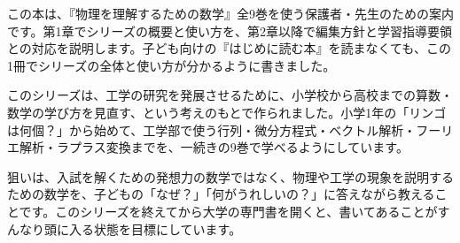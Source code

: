 \makeatletter
\newcommand\kgdspine[5]{%
  \fill[bkVol#2, draw=bkInk!60, line width=0.5pt, rounded corners=0.6mm] (#1,0) rectangle ++(#3,64);
  \node[text=bkOn#2, font=\sffamily\bfseries\footnotesize, inner sep=0pt] at ({#1+#3/2},58.5) {#2};
  \node[text=bkOn#2, font=\sffamily\bfseries\footnotesize, inner sep=0pt, anchor=north, align=center, text width=#3 mm, execute at begin node={\baselineskip=10.6pt}] at ({#1+#3/2},53.5) {#4};%
  \node[font=\sffamily\footnotesize, text=bkInk, inner sep=0pt, anchor=north] at ({#1+#3/2},-1.6) {#5};}
\newcommand\kgdpart[5]{\node[kgb box, anchor=west, minimum width=43.5mm, text width=39.5mm, minimum height=8.6mm, align=left, inner xsep=1.5mm, inner ysep=1mm] (#5) at (#3,#4)
  {\makebox[5mm][l]{\if\relax\detokenize{#2}\relax\else\ifcsname kgd@ibox@#2\endcsname\usebox{\csname kgd@ibox@#2\endcsname}\else\bkicon[1.1em]{#2}{bkVol0}\fi\fi}\hspace{0.5mm}#1};}
\newsavebox\kgd@ibox@hatena
\sbox{}
\makeatother

\label{kgd-ch1}

この本は、『物理を理解するための数学』全9巻を使う保護者・先生のための案内です。第1章でシリーズの概要と使い方を、第2章以降で編集方針と学習指導要領との対応を説明します。子ども向けの『はじめに読む本』を読まなくても、この1冊でシリーズの全体と使い方が分かるように書きました。


このシリーズは、工学の研究を発展させるために、小学校から高校までの算数・数学の学び方を見直す、という考えのもとで作られました。小学1年の「リンゴは何個？」から始めて、工学部で使う行列・微分方程式・ベクトル解析・フーリエ解析・ラプラス変換までを、一続きの9巻で学べるようにしています。

狙いは、入試を解くための発想力の数学ではなく、物理や工学の現象を説明するための数学を、子どもの「なぜ？」「何がうれしいの？」に答えながら教えることです。このシリーズを終えてから大学の専門書を開くと、書いてあることがすんなり頭に入る状態を目標にしています。

